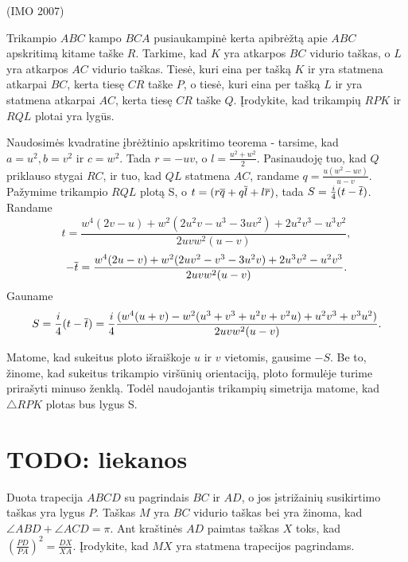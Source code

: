 \documentclass[11pt,a4paper,twoside]{book}
\begin{document}
\begin{pavnr}
(IMO 2007)

Trikampio $ABC$ kampo $BCA$ pusiaukampinė kerta apibrėžtą apie $ABC$ apskritimą kitame taške $R$. Tarkime, kad $K$ yra atkarpos $BC$ vidurio taškas, o $L$ yra atkarpos $AC$ vidurio taškas. Tiesė, kuri eina per tašką $K$ ir yra statmena atkarpai $BC$, kerta tiesę $CR$ taške $P$, o tiesė, kuri eina per tašką $L$ ir yra statmena atkarpai $AC$, kerta tiesę $CR$ taške $Q$. Įrodykite, kad trikampių $RPK$ ir $RQL$ plotai yra lygūs.
\end{pavnr}
\begin{sprendimas}

Naudosimės kvadratine įbrėžtinio apskritimo teorema - tarsime, kad $a=u^2, b=v^2$ ir $c=w^2$. Tada $r=-uv$, o $l=\frac{u^2+w^2}{2}$. Pasinaudoję tuo, kad $Q$ priklauso stygai $RC$, ir tuo, kad $QL$ statmena $AC$, randame $q=\frac{u(w^2 - uv)}{u-v}$. Pažymime trikampio $RQL$ plotą S, o $t=(r\overline{q} +q\overline{l}+l\overline{r})$, tada $S=\frac{i}{4}(t-\overline{t})$. 
Randame
$$t=\frac{w^4(2v-u) +w^2(2u^2v-u^3-3uv^2) +2u^2v^3 - u^3v^2}{2uvw^2(u-v)},$$
$$-\overline{t}=\frac{w^4(2u-v) +w^2(2uv^2-v^3-3u^2v) +2u^3v^2 - u^2v^3}{2uvw^2(u-v)}.$$
Gauname
$$S=\frac{i}{4}(t-\overline{t})=\frac{i}{4}\frac{(w^4(u+v)-w^2(u^3+v^3+u^2v+v^2u)+u^2v^3+v^3u^2)}{2uvw^2(u-v)}.$$

Matome, kad sukeitus ploto išraiškoje $u$ ir $v$ vietomis, gausime $-S$. Be to, žinome, kad sukeitus trikampio viršūnių orientaciją, ploto formulėje turime prirašyti minuso ženklą. Todėl naudojantis trikampių simetrija matome, kad $\triangle RPK$ plotas bus lygus S.
\end{sprendimas}





\section{TODO: liekanos}


\begin{pavnr}
Duota trapecija $ABCD$ su pagrindais $BC$ ir $AD$, o jos įstrižainių susikirtimo taškas yra lygus $P$. Taškas $M$ yra $BC$ vidurio taškas bei yra žinoma, kad $\angle ABD + \angle ACD = \pi.$ Ant kraštinės $AD$ paimtas taškas $X$ toks, kad $(\frac {PD}{PA})^2 = \frac {DX}{XA}$. Įrodykite, kad $MX$ yra statmena trapecijos pagrindams.
\end{pavnr}
\end{document}
